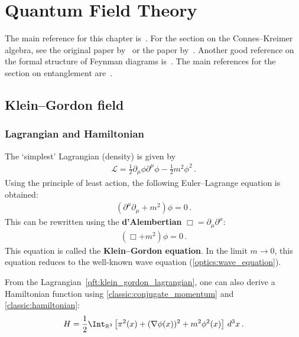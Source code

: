 \chapter{Quantum Field Theory}

    The main reference for this chapter is~\citet{peskin_introduction_1995}. For the section on the Connes--Kreimer algebra, see the original paper by~\citet{connes_hopf_1998} or the paper by~\citet{ebrahimi-fard_hopf_2005}. Another good reference on the formal structure of Feynman diagrams is~\citet{yeats_combinatorial_2017}. The main references for the section on entanglement are~\citet{tuybens_entanglement_2017,rangamani_holographic_2017}.

    \minitoc

\section{Klein--Gordon field}
\subsection{Lagrangian and Hamiltonian}

    The `simplest' Lagrangian (density) is given by
    \begin{gather}
        \label{qft:klein_gordon_lagrangian}
        \mathcal{L} = \frac{1}{2}\partial_\mu\phi\partial^\mu\phi - \frac{1}{2}m^2\phi^2\,.
    \end{gather}
    Using the principle of least action, the following Euler--Lagrange equation is obtained:
    \begin{gather}
        \left(\partial^\mu\partial_\mu + m^2\right)\phi = 0\,.
    \end{gather}
    This can be rewritten using the \textbf{d'Alembertian} $\Box = \partial_\mu\partial^\mu$:
    \begin{gather}
        \label{qft:klein_gordon_equation}
        (\Box+m^2)\phi = 0\,.
    \end{gather}
    This equation is called the \textbf{Klein--Gordon equation}. In the limit $m\longrightarrow0$, this equation reduces to the well-known wave equation (\cref{optics:wave_equation}).

    From the Lagrangian~\eqref{qft:klein_gordon_lagrangian}, one can also derive a Hamiltonian function using \cref{classic:conjugate_momentum} and \cref{classic:hamiltonian}:
    \begin{gather}
        \label{qft:klein_gordon_hamiltonian}
        H = \frac{1}{2}\Int_{\mathbb{R}^3}\left[\pi^2(x) + (\nabla\phi(x))^2 + m^2\phi^2(x)\right]\,d^3x\,.
    \end{gather}


